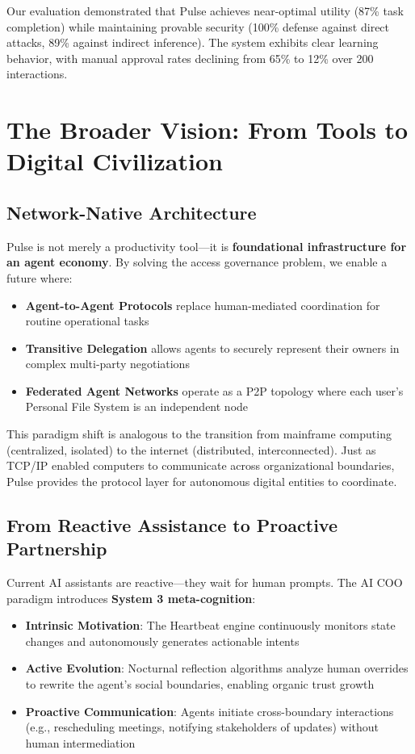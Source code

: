 Our evaluation demonstrated that Pulse achieves near-optimal utility (87\% task completion) while maintaining provable security (100\% defense against direct attacks, 89\% against indirect inference). The system exhibits clear learning behavior, with manual approval rates declining from 65\% to 12\% over 200 interactions.

\section{The Broader Vision: From Tools to Digital Civilization}

\subsection{Network-Native Architecture}

Pulse is not merely a productivity tool—it is \textbf{foundational infrastructure for an agent economy}. By solving the access governance problem, we enable a future where:

\begin{itemize}
    \item \textbf{Agent-to-Agent Protocols} replace human-mediated coordination for routine operational tasks
    \item \textbf{Transitive Delegation} allows agents to securely represent their owners in complex multi-party negotiations
    \item \textbf{Federated Agent Networks} operate as a P2P topology where each user's Personal File System is an independent node
\end{itemize}

This paradigm shift is analogous to the transition from mainframe computing (centralized, isolated) to the internet (distributed, interconnected). Just as TCP/IP enabled computers to communicate across organizational boundaries, Pulse provides the protocol layer for autonomous digital entities to coordinate.

\subsection{From Reactive Assistance to Proactive Partnership}

Current AI assistants are reactive—they wait for human prompts. The AI COO paradigm introduces \textbf{System 3 meta-cognition}:

\begin{itemize}
    \item \textbf{Intrinsic Motivation}: The Heartbeat engine continuously monitors state changes and autonomously generates actionable intents
    \item \textbf{Active Evolution}: Nocturnal reflection algorithms analyze human overrides to rewrite the agent's social boundaries, enabling organic trust growth
    \item \textbf{Proactive Communication}: Agents initiate cross-boundary interactions (e.g., rescheduling meetings, notifying stakeholders of updates) without human intermediation
\end{itemize}

